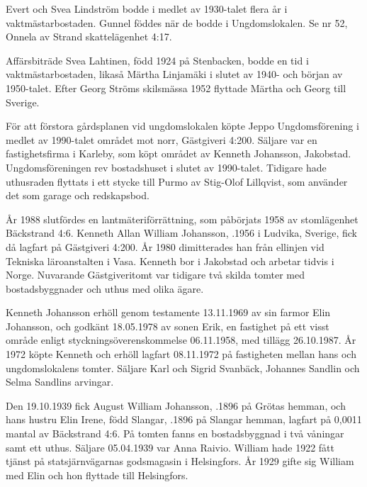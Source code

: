 Evert och Svea Lindström bodde i medlet av 1930-talet flera år i vaktmästarbostaden. Gunnel föddes när de bodde i Ungdomslokalen. Se nr 52, Onnela av Strand skattelägenhet 4:17.

Affärsbiträde Svea Lahtinen, född 1924 på Stenbacken, bodde en tid i vaktmästarbostaden, likaså Märtha Linjamäki i slutet av 1940- och början av 1950-talet. Efter Georg Ströms skilsmässa 1952 flyttade Märtha och Georg till Sverige.




För att förstora gårdsplanen vid ungdomslokalen köpte Jeppo	Ungdomsförening i medlet av 1990-talet området mot norr,	Gästgiveri 4:200. Säljare var en fastighetsfirma i Karleby, som köpt området av Kenneth Johansson, Jakobstad. Ungdomsföreningen	rev bostadshuset i slutet av 1990-talet. Tidigare hade uthusraden	flyttats i ett stycke till Purmo av Stig-Olof Lillqvist, som använder det som garage och redskapsbod.


År 1988 slutfördes en lantmäteriförrättning, som påbörjats 1958	av stomlägenhet Bäckstrand 4:6. Kenneth Allan William Johansson,	.1956 i Ludvika, Sverige, fick då lagfart på Gästgiveri 4:200.	År 1980 dimitterades han från ellinjen vid Tekniska läroanstalten i Vasa.	Kenneth bor i Jakobstad och arbetar tidvis i Norge.	Nuvarande Gästgiveritomt var tidigare två skilda tomter med	bostadsbyggnader och uthus med olika ägare.

Kenneth Johansson erhöll genom testamente 13.11.1969 av sin farmor Elin Johansson, och godkänt 18.05.1978 av sonen Erik, en fastighet på ett visst område enligt styckningsöverenskommelse 06.11.1958, med tillägg 26.10.1987. År 1972 köpte Kenneth och erhöll lagfart 08.11.1972 på fastigheten mellan hans och ungdomslokalens tomter. Säljare Karl och Sigrid Svanbäck, Johannes Sandlin och Selma Sandlins arvingar.


Den 19.10.1939 fick August William Johansson, .1896 på	Grötas hemman, och hans hustru Elin Irene, född Slangar, .1896	på Slangar hemman, lagfart på 0,0011 mantal av Bäckstrand 4:6. På tomten fanns en bostadsbyggnad i två våningar samt ett uthus. Säljare 05.04.1939 var Anna Raivio. William hade 1922 fått tjänst på 	statsjärnvägarnas godsmagasin i Helsingfors. År 1929 gifte sig William med Elin och hon flyttade till Helsingfors.

